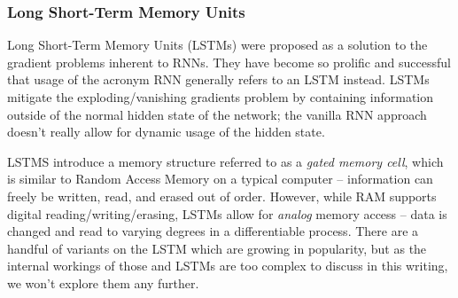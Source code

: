 \documentclass{report}
\begin{document}
\subsubsection{Long Short-Term Memory Units}
Long Short-Term Memory Units (LSTMs) were proposed as a solution to the gradient problems inherent to RNNs. They have become so prolific and successful that usage of the acronym RNN generally refers to an LSTM instead. LSTMs mitigate the exploding/vanishing gradients problem by containing information outside of the normal hidden state of the network; the vanilla RNN approach doesn't really allow for dynamic usage of the hidden state. \par
LSTMS introduce a memory structure referred to as a \textit{gated memory cell}, which is similar to Random Access Memory on a typical computer -- information can freely be written, read, and erased out of order. However, while RAM supports digital reading/writing/erasing, LSTMs allow for \emph{analog} memory access -- data is changed and read to varying degrees in a differentiable process. There are a handful of variants on the LSTM which are growing in popularity, but as the internal workings of those and LSTMs are too complex to discuss in this writing, we won't explore them any further. \par
\end{document}
